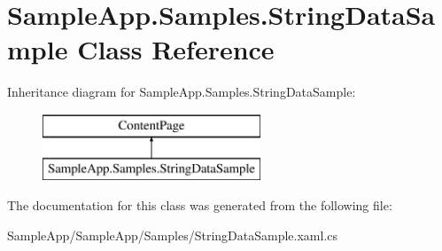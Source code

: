 \hypertarget{class_sample_app_1_1_samples_1_1_string_data_sample}{}\section{Sample\+App.\+Samples.\+String\+Data\+Sample Class Reference}
\label{class_sample_app_1_1_samples_1_1_string_data_sample}
Inheritance diagram for Sample\+App.\+Samples.\+String\+Data\+Sample\+:\begin{figure}[H]
\begin{center}
\leavevmode
\includegraphics[height=2.000000cm]{class_sample_app_1_1_samples_1_1_string_data_sample}
\end{center}
\end{figure}


The documentation for this class was generated from the following file\+:\begin{DoxyCompactItemize}
\item 
Sample\+App/\+Sample\+App/\+Samples/String\+Data\+Sample.\+xaml.\+cs\end{DoxyCompactItemize}
